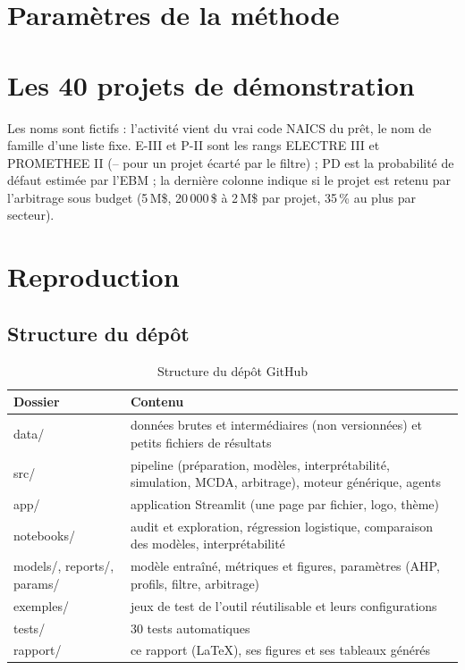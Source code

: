 \chapter{Paramètres de la méthode}\label{ann:parametres}





\chapter{Les 40 projets de démonstration}\label{ann:projets}

Les noms sont fictifs : l'activité vient du vrai code NAICS du prêt, le nom de famille d'une liste fixe. E-III et P-II
sont les rangs ELECTRE III et PROMETHEE II (\og -- \fg{} pour un projet écarté par le filtre) ; PD est la probabilité
de défaut estimée par l'EBM ; la dernière colonne indique si le projet est retenu par l'arbitrage sous budget
(5\,M\$, 20\,000\,\$ à 2\,M\$ par projet, 35\,\% au plus par secteur).



\chapter{Reproduction}\label{ann:reproduction}

\section{Structure du dépôt}

\begin{table}[htbp]
\centering\small
\caption{Structure du dépôt GitHub}\label{tab:depot}
\begin{tabularx}{\textwidth}{>{\ttfamily}p{3.6cm}X}
\toprule
\normalfont Dossier & Contenu \\
\midrule
data/ & données brutes et intermédiaires (non versionnées) et petits fichiers de résultats \\
src/ & pipeline (préparation, modèles, interprétabilité, simulation, MCDA, arbitrage), moteur générique, agents \\
app/ & application Streamlit (une page par fichier, logo, thème) \\
notebooks/ & audit et exploration, régression logistique, comparaison des modèles, interprétabilité \\
models/, reports/, params/ & modèle entraîné, métriques et figures, paramètres (AHP, profils, filtre, arbitrage) \\
exemples/ & jeux de test de l'outil réutilisable et leurs configurations \\
tests/ & 30 tests automatiques \\
rapport/ & ce rapport (LaTeX), ses figures et ses tableaux générés \\
\bottomrule
\end{tabularx}
\end{table}


